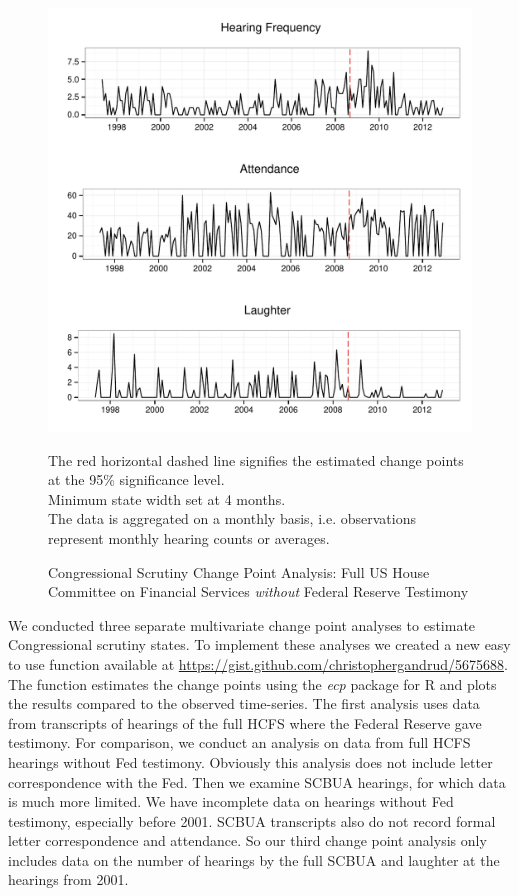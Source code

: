 \documentclass[a4paper]{article}\usepackage[]{graphicx}\usepackage[]{color}
\newenvironment{knitrout}{}{} %
\begin{document}
\begin{figure}
    \caption{Congressional Scrutiny Change Point Analysis: Full US House Committee on Financial Services \emph{without} Federal Reserve Testimony}
    \label{fig:BaseNonFedCP}
\begin{knitrout}
\color{fgcolor}

{\centering \includegraphics[width=0.8\linewidth]{figure/ScrutinyNonFedCP} 

}



\end{knitrout}
{\scriptsize{The red horizontal dashed line signifies the estimated change points at the 95\% significance level.\\
Minimum state width set at 4 months. \\
The data is aggregated on a monthly basis, i.e. observations represent monthly hearing counts or averages.}}
\end{figure}

We conducted three separate multivariate change point analyses to estimate Congressional scrutiny states. To implement these analyses we created a new easy to use function available at \url{https://gist.github.com/christophergandrud/5675688}. The function estimates the change points using the \emph{ecp} \citep{R-ecp} package for R \citep{CiteR} and plots the results compared to the observed time-series. The first analysis uses data from transcripts of hearings of the full HCFS where the Federal Reserve gave testimony. For comparison, we conduct an analysis on data from full HCFS hearings without Fed testimony. Obviously this analysis does not include letter correspondence with the Fed. Then we examine SCBUA hearings, for which data is much more limited. We have incomplete data on hearings without Fed testimony, especially before 2001. SCBUA transcripts also do not record formal letter correspondence and attendance. So our third change point analysis only includes data on the number of hearings by the full SCBUA and laughter at the hearings from 2001.
\end{document}
